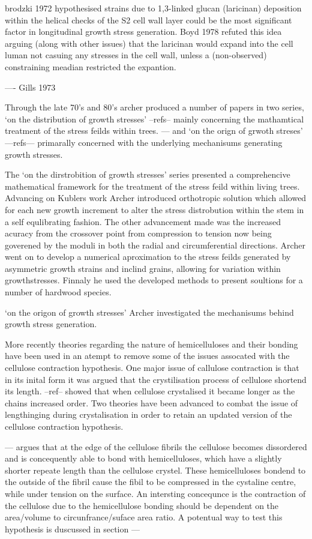 \documentclass{article}
\begin{document}
brodzki 1972 hypothesised strains due to 1,3-linked glucan (laricinan)
deposition within the helical checks of the S2 cell wall layer could be the
most significant factor in longitudinal growth stress generation. Boyd 1978
refuted this idea arguing (along with other issues) that the laricinan would
expand into the cell luman not casuing any stresses in the cell wall, unless a
(non-observed) constraining meadian restricted the expantion.

---- Gills 1973

Through the late 70's and 80's archer produced a number of papers in two series,
`on the distribution of growth stresses' --refs-- mainly concerning the
mathamtical treatment of the stress feilds within trees. --- and `on the
orign of grwoth streses' ---refs--- primarally concerned with the underlying
mechanisums generating growth stresses.

The `on the dirstrobition of growth stresses' series presented a comprehencive
mathematical framework for the treatment of the stress feild within living
trees. Advancing on Kublers work Archer introduced orthotropic solution which
allowed for each new growth increment to alter the stress distrobution within
the stem in a self equlibrating fashion. The other advancement made was the
increased acuracy from the crossover point from compression to tension now being
goverened by the moduli in both the radial and circumferential directions.
Archer went on to develop a numerical aproximation to the stress feilds
generated by asymmetric growth strains and inclind grains, allowing for
variation within growthstresses. Finnaly he used the developed methods to
present soultions for a number of hardwood species.

`on the origon of growth stresses' Archer investigated the mechanisums behind
growth stress generation.

More recently theories regarding the nature of hemicelluloses and their bonding
have been used in an atempt to remove some of the issues assocated with the
cellulose contraction hypothesis. One major issue of callulose contraction is
that in its inital form it was argued that the crystilisation process of cellulose
shortend its length. --ref-- showed that when cellulose crystalised it became
longer as the chains increased order. Two theories have been advanced to combat
the issue of lengthinging during crystalisation in order to retain an updated
version of the cellulose contraction hypothesis.

--- argues that at the edge of the cellulose fibrils the cellulose becomes
dissordered and is concequently able to bond with hemicelluloses, which have a
slightly shorter repeate length than the cellulose crystel. These hemicelluloses
bondend to the outside of the fibril cause the fibil to be compressed in the
cystaline centre, while under tension on the surface. An intersting concequnce
is the contraction of the cellulose due to the hemicellulose bonding should be
dependent on the area/volume to circunfrance/suface area ratio. A potentual way
to test this hypothesis is duscussed in section ---
\end{document}
